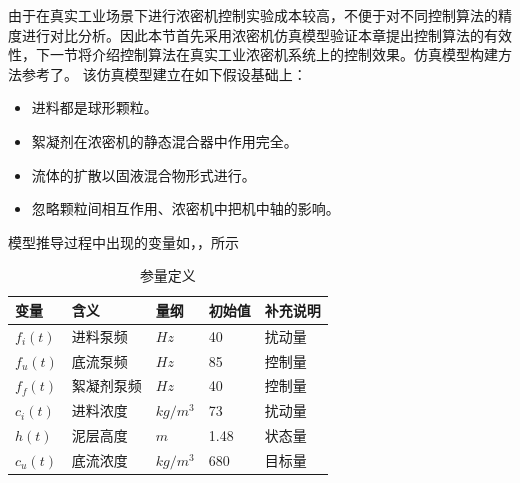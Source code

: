 由于在真实工业场景下进行浓密机控制实验成本较高，不便于对不同控制算法的精度进行对比分析。因此本节首先采用浓密机仿真模型验证本章提出控制算法的有效性，下一节将介绍控制算法在真实工业浓密机系统上的控制效果。仿真模型构建方法参考了\cite{Chai2016, KIM2004403,WangLinyan2017,WangMeng,Tang2009,Wang330}。
该仿真模型建立在如下假设基础上：
\begin{itemize}
    \item 进料都是球形颗粒。
    \item  絮凝剂在浓密机的静态混合器中作用完全。
    \item 流体的扩散以固液混合物形式进行。
    \item 忽略颗粒间相互作用、浓密机中把机中轴的影响。
\end{itemize}
模型推导过程中出现的变量如，，所示
\begin{table}[htb]
\caption{参量定义} \label{tab:dynamic_variables}
\centering

\begin{tabular}{@{}lllll@{}}
\toprule
 变量                & 含义     & 量纲       & 初始值  & 补充说明 \\ \midrule
$f_{i}(t)$        & 进料泵频   & $Hz$     & 40   & 扰动量  \\
$f_{u}(t)$        & 底流泵频   & $Hz$     & 85   & 控制量  \\
$f_{f}(t)$        & 絮凝剂泵频  & $Hz$     & 40   & 控制量  \\
$c _ { i } ( t )$ & 进料浓度   & $kg/m^3$ & 73   & 扰动量  \\
$h(t)$            & 泥层高度 & $m$      & 1.48 & 状态量  \\
$c_u(t)$          & 底流浓度   & $kg/m^3$ & 680  & 目标量  \\
\bottomrule
\end{tabular}%
\end{table}

